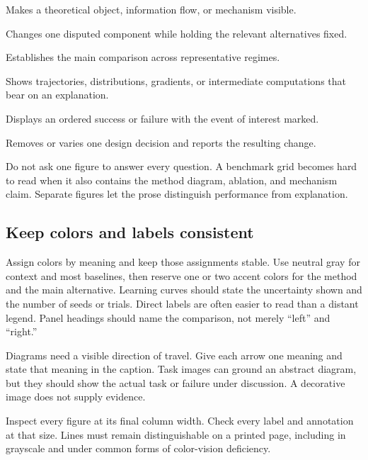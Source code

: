 \begin{description}[leftmargin=*,style=nextline]
    \item[\textbf{Concept figure.}]
    Makes a theoretical object, information flow, or mechanism visible.
    \item[\textbf{Controlled comparison.}]
    Changes one disputed component while holding the relevant alternatives
    fixed.
    \item[\textbf{Headline benchmark.}]
    Establishes the main comparison across representative regimes.
    \item[\textbf{Mechanism figure.}]
    Shows trajectories, distributions, gradients, or intermediate
    computations that bear on an explanation.
    \item[\textbf{Qualitative sequence.}]
    Displays an ordered success or failure with the event of interest marked.
    \item[\textbf{Ablation.}]
    Removes or varies one design decision and reports the resulting change.
\end{description}

Do not ask one figure to answer every question. A benchmark grid becomes hard
to read when it also contains the method diagram, ablation, and mechanism
claim. Separate figures let the prose distinguish performance from
explanation.

\subsection{Keep colors and labels consistent}

Assign colors by meaning and keep those assignments stable. Use neutral gray
for context and most baselines, then reserve one or two accent colors for the
method and the main alternative. Learning curves should state the uncertainty
shown and the number of seeds or trials. Direct labels are often easier to read
than a distant legend. Panel headings should name the comparison, not merely
``left'' and ``right.''

Diagrams need a visible direction of travel. Give each arrow one meaning and
state that meaning in the caption. Task images can ground an abstract diagram,
but they should show the actual task or failure under discussion. A decorative
image does not supply evidence.

Inspect every figure at its final column width. Check every label and
annotation at that size. Lines must remain distinguishable on a printed page,
including in grayscale and under common forms of color-vision deficiency.

